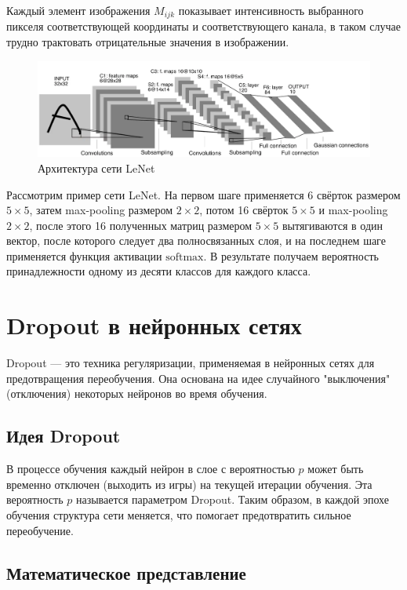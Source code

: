 \documentclass{article}
\theoremstyle{definition}
\theoremstyle{theorem}
\theoremstyle{remark}
\theoremstyle{theorem}
\theoremstyle{example}
\theoremstyle{theorem}
\theoremstyle{theorem}
\theoremstyle{theorem}
\theoremstyle{theorem}
\begin{document}
		Каждый элемент изображения $M_{ijk}$ показывает интенсивность выбранного пикселя соответствующей координаты и соответствующего канала, в таком случае трудно трактовать отрицательные значения в изображении.
		\newpage
		\begin{figure}[h!]
			\includegraphics[width=\textwidth]{lesnet.png}\caption{Архитектура сети LeNet}
		\end{figure}
		Рассмотрим пример сети LeNet. На первом шаге применяется 6 свёрток размером $5\times5$, затем max-pooling размером $2\times2$, потом 16 свёрток $5\times 5$  и max-pooling $2\times2$, после этого 16 полученных матриц размером $5\times5$ вытягиваются в один вектор, после которого следует два полносвязанных слоя, и на последнем шаге применяется функция активации $\mathrm{softmax}$. В результате получаем вероятность принадлежности одному из десяти классов для каждого класса.
			\section{Dropout в нейронных сетях}
		
		Dropout — это техника регуляризации, применяемая в нейронных сетях для предотвращения переобучения. Она основана на идее случайного "выключения" (отключения) некоторых нейронов во время обучения.
		
		\subsection{Идея Dropout}
		
		В процессе обучения каждый нейрон в слое с вероятностью $p$ может быть временно отключен (выходить из игры) на текущей итерации обучения. Эта вероятность $p$ называется параметром Dropout. Таким образом, в каждой эпохе обучения структура сети меняется, что помогает предотвратить сильное переобучение.
		
		\subsection{Математическое представление}
		
\end{document}
